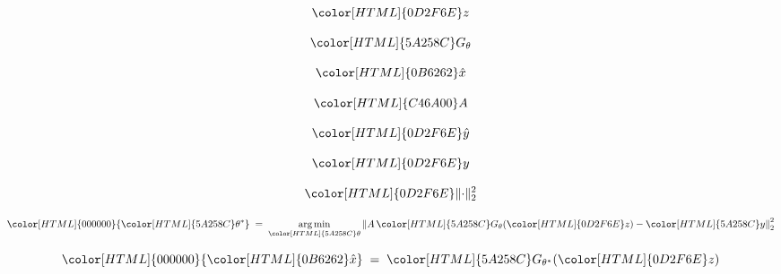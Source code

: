 \[{\color[HTML]{0D2F6E}z}\]

\[{\color[HTML]{5A258C}G_{\theta}}\]

\[{\color[HTML]{0B6262}\hat{x}}\]

\[{\color[HTML]{C46A00}A}\]

\[{\color[HTML]{0D2F6E}\hat{y}}\]

\[{\color[HTML]{0D2F6E}y}\]

\[{\color[HTML]{0D2F6E}\lVert\cdot\rVert_{2}^{2}}\]

\[{\color[HTML]{000000}{\color[HTML]{5A258C}\theta^{\ast}}\;=\;\operatorname*{arg\,min}_{{\color[HTML]{5A258C}\theta}}\left\lVert A\,{\color[HTML]{5A258C}G_{\theta}}({\color[HTML]{0D2F6E}z})-{\color[HTML]{5A258C}y}\right\rVert_{2}^{2}}\]

\[{\color[HTML]{000000}{\color[HTML]{0B6262}\hat{x}}\;=\;{\color[HTML]{5A258C}G_{\theta^{\ast}}}({\color[HTML]{0D2F6E}z})}\]
